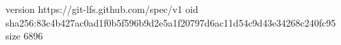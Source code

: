 version https://git-lfs.github.com/spec/v1
oid sha256:83c4b427ac0ad1f0b5f596b9d2e5a1f20797d6ac11d54c9d43e34268c240fc95
size 6896
